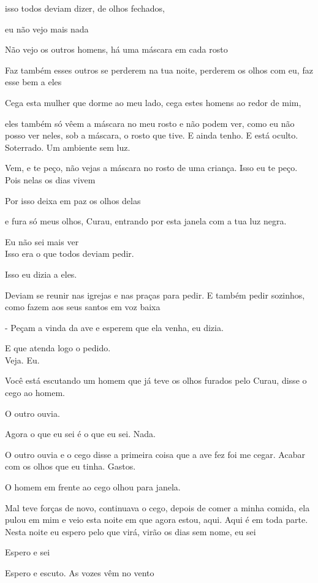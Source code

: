 isso todos deviam dizer, de olhos fechados,

eu não vejo mais nada

Não vejo os outros homens, há uma máscara em cada rosto

Faz também esses outros se perderem na tua noite, perderem os olhos com
eu, faz esse bem a eles

Cega esta mulher que dorme ao meu lado, cega estes homens ao redor de
mim,

eles também só vêem a máscara no meu rosto e não podem ver, como eu não
posso ver neles, sob a máscara, o rosto que tive. E ainda tenho. E está
oculto. Soterrado. Um ambiente sem luz.

Vem, e te peço, não vejas a máscara no rosto de uma criança. Isso eu te
peço. Pois nelas os dias vivem

Por isso deixa em paz os olhos delas

e fura só meus olhos, Curau, entrando por esta janela com a tua luz
negra.

Eu não sei mais ver\\

Isso era o que todos deviam pedir.

Isso eu dizia a eles.

Deviam se reunir nas igrejas e nas praças para pedir. E também pedir
sozinhos, como fazem aos seus santos em voz baixa

- Peçam a vinda da ave e esperem que ela venha, eu dizia.

E que atenda logo o pedido.\\

Veja. Eu.

Você está escutando um homem que já teve os olhos furados pelo Curau,
disse o cego ao homem.

O outro ouvia.

Agora o que eu sei é o que eu sei. Nada.

O outro ouvia e o cego disse a primeira coisa que a ave fez foi me
cegar. Acabar com os olhos que eu tinha. Gastos.

O homem em frente ao cego olhou para janela.

Mal teve forças de novo, continuava o cego, depois de comer a minha
comida, ela pulou em mim e veio esta noite em que agora estou, aqui.
Aqui é em toda parte. Nesta noite eu espero pelo que virá, virão os dias
sem nome, eu sei

Espero e sei

Espero e escuto. As vozes vêm no vento

